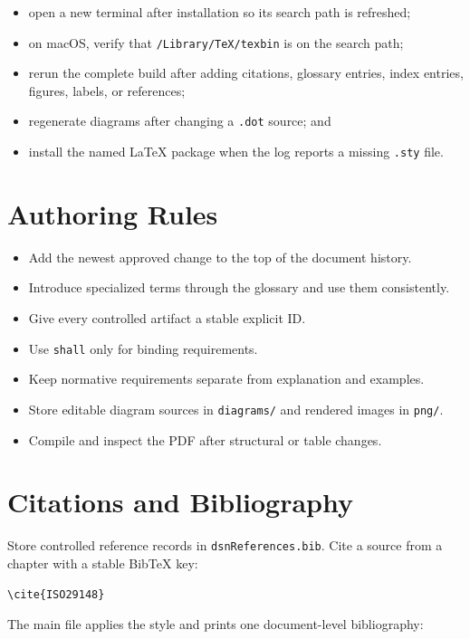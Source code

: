 \begin{itemize}
\item open a new terminal after installation so its search path is refreshed;
\item on macOS, verify that \texttt{/Library/TeX/texbin} is on the search path;
\item rerun the complete build after adding citations, glossary entries, index
entries, figures, labels, or references;
\item regenerate diagrams after changing a \texttt{.dot} source; and
\item install the named LaTeX package when the log reports a missing
\texttt{.sty} file.
\end{itemize}

\section{Authoring Rules}

\begin{itemize}
\item Add the newest approved change to the top of the document history.
\item Introduce specialized terms through the glossary and use them consistently.
\item Give every controlled artifact a stable explicit ID.
\item Use \texttt{shall} only for binding requirements.
\item Keep normative requirements separate from explanation and examples.
\item Store editable diagram sources in \texttt{diagrams/} and rendered images in \texttt{png/}.
\item Compile and inspect the PDF after structural or table changes.
\end{itemize}

\section{Citations and Bibliography}

Store controlled reference records in \texttt{dsnReferences.bib}. Cite a
source from a chapter with a stable BibTeX key:

\begin{verbatim}
\cite{ISO29148}
\end{verbatim}

The main file applies the style and prints one document-level bibliography:

